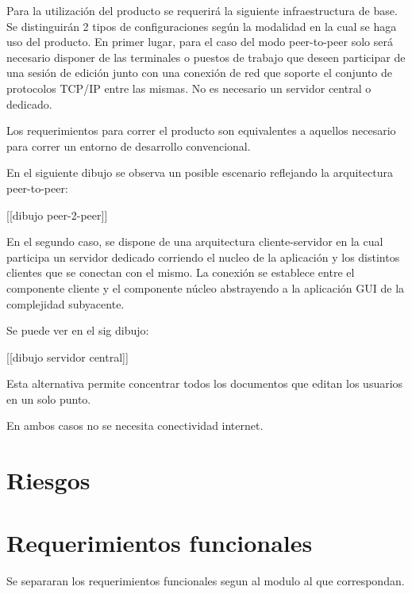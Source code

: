 \documentclass[12pt,a4paper]{article}
\begin{document}
Para la utilización del producto se requerirá la siguiente infraestructura de base.
Se distinguirán 2 tipos de configuraciones según la modalidad en la cual se haga uso del producto.
En primer lugar, para el caso del modo peer-to-peer solo será necesario disponer de las terminales o puestos de trabajo que deseen participar de una sesión de edición junto con una conexión de red que soporte el conjunto de protocolos TCP/IP entre las mismas. No es necesario un servidor central o dedicado.

Los requerimientos para correr el producto son equivalentes a aquellos necesario para correr un entorno de desarrollo convencional.

En el siguiente dibujo se observa un posible escenario reflejando la arquitectura peer-to-peer:

[[dibujo peer-2-peer]]


En el segundo caso, se dispone de una arquitectura cliente-servidor en la cual participa un servidor dedicado corriendo el nucleo de la aplicación y los distintos clientes que se conectan con el mismo. La conexión se establece entre el componente cliente y el componente núcleo abstrayendo a la aplicación GUI de la complejidad subyacente.

Se puede ver en el sig dibujo:

[[dibujo servidor central]]

Esta alternativa permite concentrar todos los documentos que editan los usuarios en un solo punto.

En ambos casos no se necesita conectividad internet.	
	
	\section{Riesgos}
	\section{Requerimientos funcionales}
	
	Se separaran los requerimientos funcionales segun al modulo al que correspondan.
\end{document}
